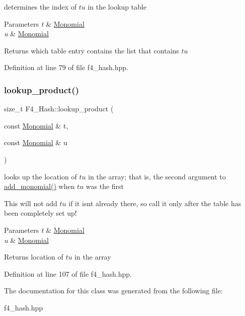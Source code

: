 determines the index of $tu$ in the lookup table 


\begin{DoxyParams}{Parameters}
{\em t} & {\ttfamily \hyperlink{group__polygroup_class_monomial}{Monomial}} \\
\hline
{\em u} & {\ttfamily \hyperlink{group__polygroup_class_monomial}{Monomial}} \\
\hline
\end{DoxyParams}
\begin{DoxyReturn}{Returns}
which table entry contains the list that contains $tu$ 
\end{DoxyReturn}


Definition at line 79 of file f4\+\_\+hash.\+hpp.

\mbox{\label{class_f4___hash_a539f858e09579b9119941795e42cdc4f}} 
\subsubsection{\texorpdfstring{lookup\+\_\+product()}{lookup\_product()}}
{\footnotesize\ttfamily size\+\_\+t F4\+\_\+\+Hash\+::lookup\+\_\+product (\begin{DoxyParamCaption}\item[{const \hyperlink{group__polygroup_class_monomial}{Monomial} \&}]{t,  }\item[{const \hyperlink{group__polygroup_class_monomial}{Monomial} \&}]{u }\end{DoxyParamCaption})\hspace{0.3cm}{\ttfamily [inline]}}



looks up the location of $tu$ in the array; that is, the second argument to {\ttfamily \hyperlink{class_f4___hash_a86a18244162325e3d792ea39525b23f8}{add\+\_\+monomial()}} when $tu$ was the first 

This will not add $tu$ if it isn\textquotesingle{}t already there, so call it only after the table has been completely set up! 
\begin{DoxyParams}{Parameters}
{\em t} & {\ttfamily \hyperlink{group__polygroup_class_monomial}{Monomial}} \\
\hline
{\em u} & {\ttfamily \hyperlink{group__polygroup_class_monomial}{Monomial}} \\
\hline
\end{DoxyParams}
\begin{DoxyReturn}{Returns}
location of $tu$ in the array 
\end{DoxyReturn}


Definition at line 107 of file f4\+\_\+hash.\+hpp.



The documentation for this class was generated from the following file\+:\begin{DoxyCompactItemize}
\item 
f4\+\_\+hash.\+hpp\end{DoxyCompactItemize}
